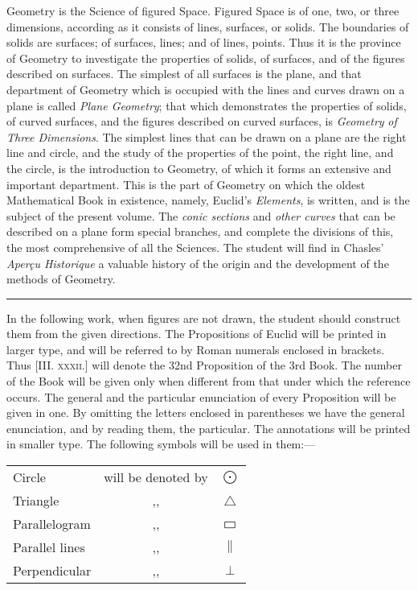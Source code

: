 \documentclass[oneside]{book}
\newcommand\pgram{
	\setlength{\unitlength}{1pt}
	\begin{picture}(11,8)(0,0)
	\linethickness{0.5pt}
	\put(1,0){\line(1,0){9}}
	\put(1,0){\line(0,1){5}}
	\put(1,5){\line(1,0){9}}
	\put(10,0){\line(0,1){5}}
	\end{picture}}
\begin{document}
\noindent Geometry is the Science of figured Space. Figured
Space is of one, two, or three dimensions, according
as it consists of lines, surfaces, or solids. The
boundaries of solids are surfaces; of surfaces, lines;
and of lines, points. Thus it is the province of
Geometry to investigate the properties of solids,
of surfaces, and of the figures described on surfaces.
The simplest of all surfaces is the plane,
and that department of Geometry which is occupied
with the lines and curves drawn on a plane
is called \textit{Plane Geometry}; that which demonstrates
the properties of solids, of curved surfaces, and the
figures described on curved surfaces, is \textit{Geometry}
\textit{of Three Dimensions}. The simplest lines that can
be drawn on a plane are the right line and circle,
and the study of the properties of the point, the
right line, and the circle, is the introduction to
Geometry, of which it forms an extensive and important
department. This is the part of Geometry
on which the oldest Mathematical Book in existence,
namely, Euclid's \textit{Elements}, is written, and
is the subject of the present volume. The \textit{conic
sections} and \textit{other curves} that can be described on
a plane form special branches, and complete the
divisions of this, the most comprehensive of all the
Sciences. The student will find in Chasles' \textit{Aperçu
Historique} a valuable history of the origin and
the development of the methods of Geometry.

\vspace{0.2in}
\begin{center}
\rule[1ex]{5cm}{.2pt}
\end{center}
\vspace{0.2in}

In the following work, when figures are not
drawn, the student should construct them from the
given directions. The Propositions of Euclid will
be printed in larger type, and will be referred to
by Roman numerals enclosed in brackets. Thus
[III\@. \textsc{xxxii.}] will denote the 32nd Proposition
of the 3rd Book. The number of the Book will
be given only when different from that under
which the reference occurs. The general and the
particular enunciation of every Proposition will be
given in one. By omitting the letters enclosed
in parentheses we have the general enunciation,
and by reading them, the particular. The annotations
will be printed in smaller type. The
following symbols will be used in them:---

\begin{tabular}{l c c}
Circle & will be denoted by & $\bigodot$ \\
Triangle & ,, & $\triangle$ \\
Parallelogram & ,, & $\pgram$ \\
Parallel lines & ,, & $\parallel$ \\
Perpendicular & ,, & $\perp$
\end{tabular}
\end{document}
